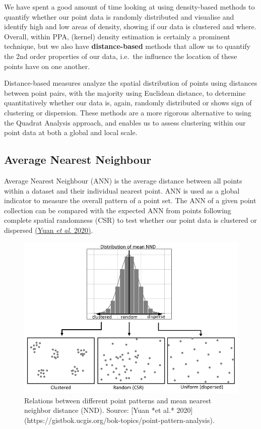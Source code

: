 \documentclass[
]{book}
\begin{document}
We have spent a good amount of time looking at using density-based methods to quantify whether our point data is randomly distributed and visualise and identify high and low areas of density, showing if our data is clustered and where. Overall, within PPA, (kernel) density estimation is certainly a prominent technique, but we also have \textbf{distance-based} methods that allow us to quantify the 2nd order properties of our data, i.e.~the influence the location of these points have on one another.

Distance-based measures analyze the spatial distribution of points using distances between point pairs, with the majority using Euclidean distance, to determine quantitatively whether our data is, again, randomly distributed or shows sign of clustering or dispersion. These methods are a more rigorous alternative to using the Quadrat Analysis approach, and enables us to assess clustering within our point data at both a global and local scale.

\hypertarget{average-nearest-neighbour}{%
\subsection{Average Nearest Neighbour}\label{average-nearest-neighbour}}

Average Nearest Neighbour (ANN) is the average distance between all points within a dataset and their individual nearest point. ANN is used as a global indicator to measure the overall pattern of a point set. The ANN of a given point collection can be compared with the expected ANN from points following complete spatial randomness (CSR) to test whether our point data is clustered or dispersed \href{https://gistbok.ucgis.org/bok-topics/point-pattern-analysis}{(Yuan \emph{et al.} 2020)}.

\begin{figure}

{\centering \includegraphics[width=11.11in]{images/w08/ann_ppa} 

}

\caption{Relations between different point patterns and mean nearest neighbor distance (NND). Source: [Yuan *et al.* 2020](https://gistbok.ucgis.org/bok-topics/point-pattern-analysis).}\label{fig:08-ann}
\end{figure}
\end{document}

